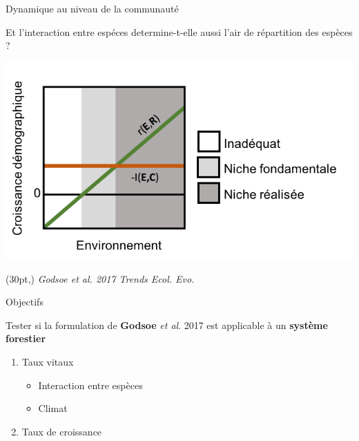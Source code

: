 \documentclass[11pt, compress, aspectratio=1610]{beamer}
\newcommand\smallcitation[1]{%
\begin{textblock*}{\textwidth}(30pt,\textheight)
	\raggedleft \footnotesize\textit{#1}
\end{textblock*}}
\providecommand{\tightlist}{%
  \setlength{\itemsep}{0pt}\setlength{\parskip}{0pt}}
\begin{document}
\begin{frame}{Dynamique au niveau de la communauté}
\protect\hypertarget{dynamique-au-niveau-de-la-communautuxe9}{}

Et l’interaction entre espéces determine-t-elle aussi l’air de
répartition des espèces ?

\centering

\includegraphics[scale=0.685]{figures/Godsoe2017b.png}

\par

\smallcitation{Godsoe et al. 2017 Trends Ecol. Evo.}

\end{frame}

\begin{frame}{Objectifs}
\protect\hypertarget{objectifs-2}{}

\centering

Tester si la formulation de \textbf{Godsoe} \emph{et al}. 2017 est
applicable à un \textbf{système forestier}

\begin{enumerate}
[1.]
\tightlist
\item
  Taux vitaux

  \begin{itemize}
  \tightlist
  \item
    Interaction entre espèces
  \item
    Climat
  \end{itemize}
\item
  Taux de croissance
\end{enumerate}

\end{frame}
\end{document}
